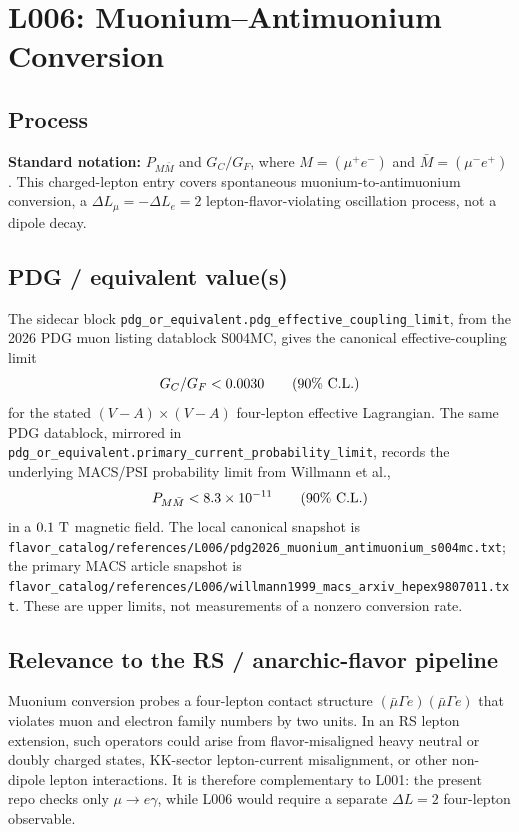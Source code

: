 
\section{L006: Muonium--Antimuonium Conversion}

\subsection*{Process}
\textbf{Standard notation:} \(P_{M\bar M}\) and \(G_C/G_F\), where
\(M=(\mu^+ e^-)\) and \(\bar M=(\mu^- e^+)\).  This charged-lepton entry covers
spontaneous muonium-to-antimuonium conversion, a \(\Delta L_\mu=-\Delta L_e=2\)
lepton-flavor-violating oscillation process, not a dipole decay.

\subsection*{PDG / equivalent value(s)}
The sidecar block
\texttt{pdg\_or\_equivalent.pdg\_effective\_coupling\_limit}, from the 2026
PDG muon listing datablock S004MC, gives the canonical effective-coupling
limit
\[
  G_C/G_F < 0.0030 \qquad (90\%\ {\rm C.L.})
\]
for the stated \((V-A)\times(V-A)\) four-lepton effective Lagrangian.  The same
PDG datablock, mirrored in
\texttt{pdg\_or\_equivalent.primary\_current\_probability\_limit}, records the
underlying MACS/PSI probability limit from Willmann et al.,
\[
  P_{M\bar M} < 8.3\times 10^{-11}\qquad (90\%\ {\rm C.L.})
\]
in a \(0.1~{\rm T}\) magnetic field.  The local canonical snapshot is
\texttt{flavor\_catalog/references/L006/pdg2026\_muonium\_antimuonium\_s004mc.txt};
the primary MACS article snapshot is
\texttt{flavor\_catalog/references/L006/willmann1999\_macs\_arxiv\_hepex9807011.txt}.
These are upper limits, not measurements of a nonzero conversion rate.

\subsection*{Relevance to the RS / anarchic-flavor pipeline}
Muonium conversion probes a four-lepton contact structure
\((\bar\mu\Gamma e)(\bar\mu\Gamma e)\) that violates muon and electron family
numbers by two units.  In an RS lepton extension, such operators could arise
from flavor-misaligned heavy neutral or doubly charged states, KK-sector
lepton-current misalignment, or other non-dipole lepton interactions.  It is
therefore complementary to L001: the present repo checks only
\(\mu\to e\gamma\), while L006 would require a separate \(\Delta L=2\)
four-lepton observable.

